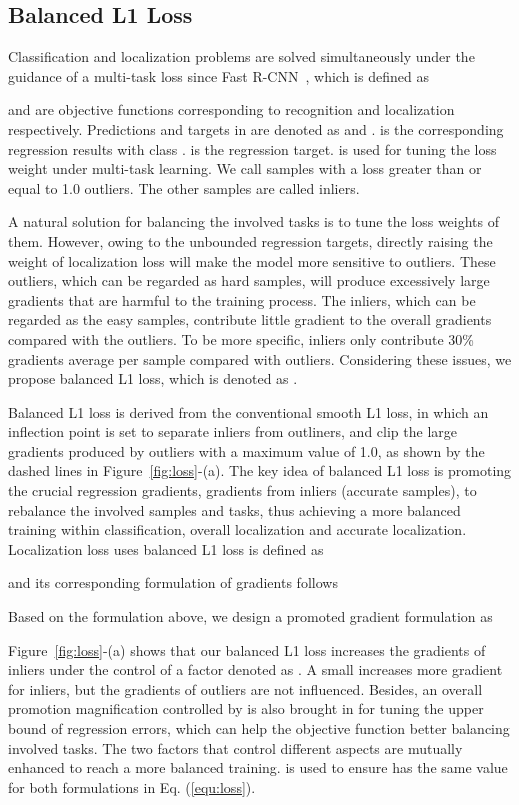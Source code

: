 \documentclass[10pt,twocolumn,letterpaper]{article}
\begin{document}
\subsection{Balanced L1 Loss}
Classification and localization problems are solved simultaneously under the guidance of a multi-task loss since Fast R-CNN~\cite{fastrcnn}, which is defined as

 and  are objective functions corresponding to recognition and localization respectively.
Predictions and targets in  are denoted as  and .
 is the corresponding regression results with class .
 is the regression target.
 is used for tuning the loss weight under multi-task learning.
We call samples with a loss greater than or equal to 1.0 outliers.
The other samples are called inliers.

A natural solution for balancing the involved tasks is to tune the loss weights of them.
However, owing to the unbounded regression targets,
directly raising the weight of localization loss will make the model more sensitive to outliers.
These outliers, which can be regarded as hard samples, will produce excessively large gradients that are harmful to the training process.
The inliers, which can be regarded as the easy samples, contribute little gradient to the overall gradients compared with the outliers.
To be more specific, inliers only contribute 30\% gradients average per sample compared with outliers.
Considering these issues, we propose balanced L1 loss, which is denoted as .

Balanced L1 loss is derived from the conventional smooth L1 loss,
in which an inflection point is set to separate inliers from outliners, and clip the large gradients produced by outliers with a maximum value of 1.0, as shown by the dashed lines in Figure~\ref{fig:loss}-(a).
The key idea of balanced L1 loss is promoting the crucial regression gradients,
\ie gradients from inliers (accurate samples), to rebalance the involved samples and tasks, thus achieving a more balanced training within classification, overall localization and accurate localization.
Localization loss  uses balanced L1 loss is defined as

and its corresponding formulation of gradients follows

Based on the formulation above, we design a promoted gradient formulation as


Figure~\ref{fig:loss}-(a) shows that our balanced L1 loss increases the gradients of inliers under the control of a factor denoted as .
A small  increases more gradient for inliers, but the gradients of outliers are not influenced.
Besides, an overall promotion magnification controlled by  is also brought in for tuning the upper bound of regression errors, which can help the objective function better balancing involved tasks.
The two factors that control different aspects are mutually enhanced to reach a more balanced training.
 is used to ensure  has the same value for both formulations in Eq. (\ref{equ:loss}).
\end{document}
